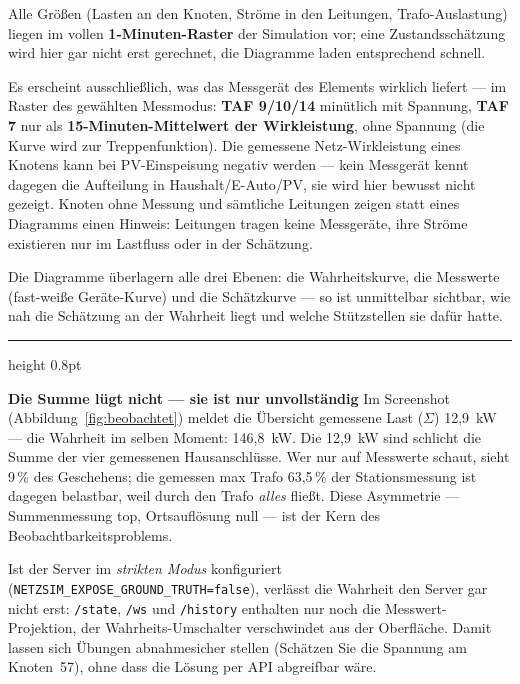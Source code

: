 \documentclass[11pt,a4paper,parskip=half]{scrreprt}
\newcommand{\ui}[1]{\textsf{\bfseries #1}}          %
\newcommand{\api}[1]{\texttt{#1}}                    %
\newenvironment{beispiel}[1][Beispiel]
  {\par\medskip
   {\color{bsp}\hrule height 0.8pt}\nopagebreak\smallskip
   \noindent\textbf{\textsf{\textcolor{bsp}{#1}}}\quad\ignorespaces}
  {\par\nopagebreak\smallskip{\color{bsp}\hrule height 0.8pt}\par\medskip}
\begin{document}
\begin{description}[nosep]
  \item[\ui{Lastfluss}] Alle Größen (Lasten an den Knoten, Ströme in
    den Leitungen, Trafo-Auslastung) liegen im vollen
    \textbf{1-Minuten-Raster} der Simulation vor; eine
    Zustandsschätzung wird hier gar nicht erst gerechnet, die
    Diagramme laden entsprechend schnell.
  \item[\ui{Gemessen}] Es erscheint ausschließlich, was das Messgerät
    des Elements wirklich liefert --- im Raster des gewählten
    Messmodus: \ui{TAF 9/10/14} minütlich mit Spannung, \ui{TAF 7}
    nur als \textbf{15-Minuten-Mittelwert der Wirkleistung}, ohne
    Spannung (die Kurve wird zur Treppenfunktion). Die gemessene
    Netz-Wirkleistung eines Knotens kann bei PV-Einspeisung negativ
    werden --- kein Messgerät kennt dagegen die Aufteilung in
    Haushalt/E-Auto/PV, sie wird hier bewusst nicht gezeigt. Knoten
    ohne Messung und sämtliche Leitungen zeigen statt eines
    Diagramms einen Hinweis: Leitungen tragen keine Messgeräte,
    ihre Ströme existieren nur im Lastfluss oder in der Schätzung.
  \item[\ui{Schätzung}] Die Diagramme überlagern alle drei Ebenen:
    die Wahrheitskurve, die Messwerte (fast-weiße \glqq
    Geräte\grqq-Kurve) und die Schätzkurve --- so ist unmittelbar
    sichtbar, wie nah die Schätzung an der Wahrheit liegt und
    welche Stützstellen sie dafür hatte.
\end{description}

\begin{beispiel}[Die Summe lügt nicht --- sie ist nur unvollständig]
Im Screenshot (Abbildung~\ref{fig:beobachtet}) meldet die Übersicht
\glqq gemessene Last ($\Sigma$) 12{,}9~kW\grqq{} --- die Wahrheit im
selben Moment: 146{,}8~kW. Die 12{,}9~kW sind schlicht die Summe der
vier gemessenen Hausanschlüsse. Wer nur auf Messwerte schaut, sieht
9\,\% des Geschehens; die \glqq gemessen max Trafo 63{,}5\,\%\grqq{}
der Stationsmessung ist dagegen belastbar, weil durch den Trafo
\emph{alles} fließt. Diese Asymmetrie --- Summenmessung top,
Ortsauflösung null --- ist der Kern des Beobachtbarkeitsproblems.
\end{beispiel}

Ist der Server im \emph{strikten Modus} konfiguriert
(\texttt{NETZSIM\_EXPOSE\_GROUND\_TRUTH=false}), verlässt die
Wahrheit den Server gar nicht erst: \api{/state}, \api{/ws} und
\api{/history} enthalten nur noch die Messwert-Projektion, der
Wahrheits-Umschalter verschwindet aus der Oberfläche. Damit lassen
sich Übungen abnahmesicher stellen (\glqq Schätzen Sie die Spannung
am Knoten~57\grqq), ohne dass die Lösung per API abgreifbar wäre.
\end{document}
